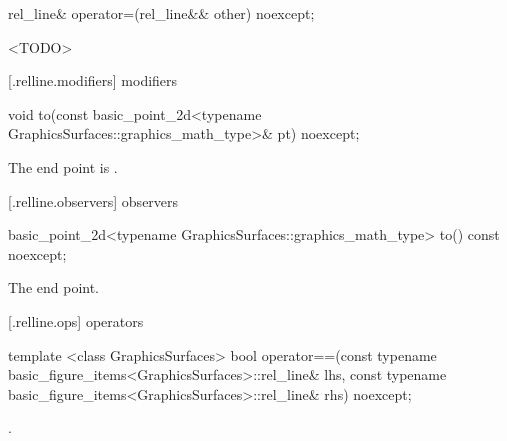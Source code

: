 %
\begin{itemdecl}
rel_line& operator=(rel_line&& other) noexcept;
\end{itemdecl}
\begin{itemdescr}
\pnum
\effects
<TODO>

\pnum
\returns
{}
\end{itemdescr}

 [\iotwod.relline.modifiers]{ modifiers}

\begin{itemdecl}
void to(const basic_point_2d<typename GraphicsSurfaces::graphics_math_type>& pt) noexcept;
\end{itemdecl}
\begin{itemdescr}
\pnum
\effects
The end point is .
\end{itemdescr}

 [\iotwod.relline.observers]{ observers}

%
\begin{itemdecl}
basic_point_2d<typename GraphicsSurfaces::graphics_math_type> to() const noexcept;
\end{itemdecl}
\begin{itemdescr}
\pnum
\returns
The end point.
\end{itemdescr}

 [\iotwod.relline.ops]{ operators}

%
\begin{itemdecl}
template <class GraphicsSurfaces>
bool operator==(const typename basic_figure_items<GraphicsSurfaces>::rel_line& lhs,
  const typename basic_figure_items<GraphicsSurfaces>::rel_line& rhs) noexcept;
\end{itemdecl}
\begin{itemdescr}
\pnum
\returns
{}.
\end{itemdescr}
